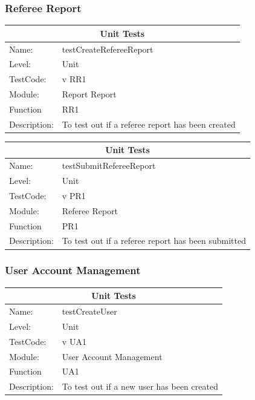 \documentclass[12pt]{article}
\begin{document}
\subsubsection{Referee Report}
\begin{center}
\begin{tabular}{|l|p{12cm}|}
\hline
\multicolumn{2}{|c|}{\bf Unit Tests} \\
\hline
 Name: & testCreateRefereeReport \\
\hline
Level: & Unit \\
\hline
TestCode: & v RR1 \\
\hline
Module:& Report Report\\
\hline
Function & RR1 \\
\hline
Description: & To test out if a referee report has been created \\
\hline

\end{tabular}
\end{center}

\begin{center}
\begin{tabular}{|l|p{12cm}|}
\hline
\multicolumn{2}{|c|}{\bf Unit Tests} \\
\hline
 Name: & testSubmitRefereeReport \\
\hline
Level: & Unit \\
\hline
TestCode: & v PR1 \\
\hline
Module:& Referee Report\\
\hline
Function & PR1 \\
\hline
Description: & To test out if a referee report has been submitted \\
\hline

\end{tabular}
\end{center}

\subsubsection{User Account Management}
\begin{center}
\begin{tabular}{|l|p{12cm}|}
\hline
\multicolumn{2}{|c|}{\bf Unit Tests} \\
\hline
 Name: & testCreateUser \\
\hline
Level: & Unit \\
\hline
TestCode: & v UA1 \\
\hline
Module:& User Account Management\\
\hline
Function & UA1 \\
\hline
Description: & To test out if a new user has been created \\
\hline

\end{tabular}
\end{center}
\end{document}
